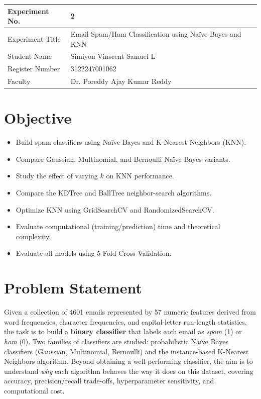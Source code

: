 \documentclass[12pt,a4paper]{article}
\begin{document}
\begin{tabular}{|p{4cm}|p{11cm}|}
\hline
Experiment No. & 2 \\ \hline
Experiment Title & Email Spam/Ham Classification using Na\"ive Bayes and KNN\footnotemark\\ \hline
Student Name & Simiyon Vinscent Samuel L \\ \hline
Register Number & 3122247001062 \\ \hline
Faculty & Dr. Poreddy Ajay Kumar Reddy \\ \hline
\end{tabular}

\section{Objective}
\begin{itemize}[nosep]
\item Build spam classifiers using Na\"ive Bayes and K-Nearest Neighbors (KNN).
\item Compare Gaussian, Multinomial, and Bernoulli Na\"ive Bayes variants.
\item Study the effect of varying $k$ on KNN performance.
\item Compare the KDTree and BallTree neighbor-search algorithms.
\item Optimize KNN using GridSearchCV and RandomizedSearchCV.
\item Evaluate computational (training/prediction) time and theoretical complexity.
\item Evaluate all models using 5-Fold Cross-Validation.
\end{itemize}

\section{Problem Statement}
Given a collection of 4601 emails represented by 57 numeric features derived from word
frequencies, character frequencies, and capital-letter run-length statistics, the task is
to build a \textbf{binary classifier} that labels each email as \textit{spam} (1) or
\textit{ham} (0). Two families of classifiers are studied: probabilistic Na\"ive Bayes
classifiers (Gaussian, Multinomial, Bernoulli) and the instance-based K-Nearest Neighbors
algorithm. Beyond obtaining a well-performing classifier, the aim is to understand
\emph{why} each algorithm behaves the way it does on this dataset, covering accuracy,
precision/recall trade-offs, hyperparameter sensitivity, and computational cost.
\end{document}

